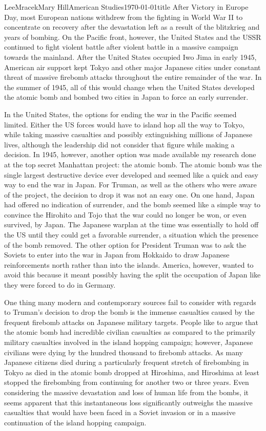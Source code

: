 \documentclass{article}
\begin{document}
\begin{mla}{Lee}{Mracek}{Mary Hill}{American Studies}{\today}{title}
        After Victory in Europe Day, most European nations withdrew from the fighting in World War II to concentrate on recovery after the devastation left as a result of the blitzkrieg and years of bombing. On the Pacific front, however, the United States and the USSR continued to fight violent battle after violent battle in a massive campaign towards the mainland. After the United States occupied Iwo Jima in early 1945, American air support kept Tokyo and other major Japanese cities under constant threat of massive firebomb attacks throughout the entire remainder of the war. In the summer of 1945, all of this would change when the United States developed the atomic bomb and bombed two cities in Japan to force an early surrender.

              In the United States, the options for ending the war in the Pacific seemed limited. Either the US forces would have to island hop all the way to Tokyo, while taking massive casualties and possibly extinguishing millions of Japanese lives, although the leadership did not consider that figure while making a decision. In 1945, however, another option was made available my research done at the top secret Manhattan project: the atomic bomb. The atomic bomb was the single largest destructive device ever developed and seemed like a quick and easy way to end the war in Japan. For Truman, as well as the others who were aware of the project, the decision to drop it was not an easy one. On one hand, Japan had offered no indication of surrender, and the bomb seemed like a simple way to convince the Hirohito and Tojo that the war could no longer be won, or even survived, by Japan. The Japanese warplan at the time was essentially to hold off the US until they could get a favorable surrender, a situation which the presence of the bomb removed. The other option for President Truman was to ask the Soviets to enter into the war in Japan from Hokkaido to draw Japanese reinforcements north rather than into the islands. America, however, wanted to avoid this because it meant possibly having the split the occupation of Japan like they were forced to do in Germany.

                 One thing many modern and contemporary sources fail to consider with regards to Truman's decision to drop the bomb is the immense casualties caused by the frequent firebomb attacks on Japanese military targets. People like to argue that the atomic bomb had incredible civilian casualties as compared to the primarily military casualties involved in the island hopping campaign; however, Japanese civilians were dying by the hundred thousand to firebomb attacks. As many Japanese citizens died during a particularly frequent stretch of firebombing in Tokyo as died in the atomic bomb dropped at Hiroshima, and Hiroshima at least stopped the firebombing from continuing for another two or three years. Even considering the massive devastation and loss of human life from the bombs, it seems apparent that this instantaneous loss significantly outweighs the massive casualties that would have been faced in a Soviet invasion or in a massive continuation of the island hopping campaign.


\end{mla}
\end{document}
